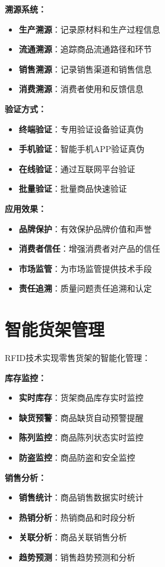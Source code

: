 \documentclass[12pt,UTF8]{ctexbook}
\begin{document}
\begin{itemize}[leftmargin=3.5em]
\begin{itemize}[leftmargin=3.5em]
\begin{itemize}[leftmargin=3.5em]
\textbf{溯源系统：}
\begin{itemize}[leftmargin=3.5em]
    \item \textbf{生产溯源}：记录原材料和生产过程信息
    \item \textbf{流通溯源}：追踪商品流通路径和环节
    \item \textbf{销售溯源}：记录销售渠道和销售信息
    \item \textbf{消费溯源}：消费者使用和反馈信息
\end{itemize}

\textbf{验证方式：}
\begin{itemize}[leftmargin=3.5em]
    \item \textbf{终端验证}：专用验证设备验证真伪
    \item \textbf{手机验证}：智能手机APP验证真伪
    \item \textbf{在线验证}：通过互联网平台验证
    \item \textbf{批量验证}：批量商品快速验证
\end{itemize}

\textbf{应用效果：}
\begin{itemize}[leftmargin=3.5em]
    \item \textbf{品牌保护}：有效保护品牌价值和声誉
    \item \textbf{消费者信任}：增强消费者对产品的信任
    \item \textbf{市场监管}：为市场监管提供技术手段
    \item \textbf{责任追溯}：质量问题责任追溯和认定
\end{itemize}

\section{智能货架管理}

RFID技术实现零售货架的智能化管理：

\textbf{库存监控：}
\begin{itemize}[leftmargin=3.5em]
    \item \textbf{实时库存}：货架商品库存实时监控
    \item \textbf{缺货预警}：商品缺货自动预警提醒
    \item \textbf{陈列监控}：商品陈列状态实时监控
    \item \textbf{防盗监控}：商品防盗和安全监控
\end{itemize}

\textbf{销售分析：}
\begin{itemize}[leftmargin=3.5em]
    \item \textbf{销售统计}：商品销售数据实时统计
    \item \textbf{热销分析}：热销商品和时段分析
    \item \textbf{关联分析}：商品关联销售分析
    \item \textbf{趋势预测}：销售趋势预测和分析
\end{itemize}


\end{itemize}
\end{itemize}
\end{itemize}
\end{document}
